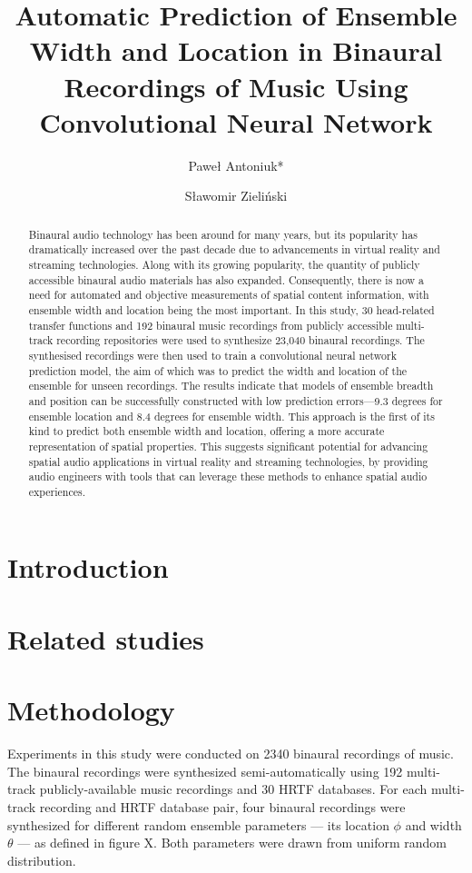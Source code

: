 \documentclass{article}
\title{Automatic Prediction of Ensemble Width and Location in Binaural Recordings of Music Using Convolutional Neural Network}
\author[1]{Paweł Antoniuk*}
\author[1]{Sławomir Zieliński}
\affil[1]{Faculty of Computer Science, Białystok University of Technology, 15-351 Białystok, Poland; pawel.antoniuk@sd.pb.edu.pl}
\affil[*]{Corresponding author: pawel.antoniuk@sd.pb.edu.pl}
\date{}
\begin{document}
\maketitle

\begin{abstract}
Binaural audio technology has been around for many years, but its popularity has dramatically increased over the past decade due to advancements in virtual reality and streaming technologies. Along with its growing popularity, the quantity of publicly accessible binaural audio materials has also expanded. Consequently, there is now a need for automated and objective measurements of spatial content information, with ensemble width and location being the most important. In this study, 30 head-related transfer functions and 192 binaural music recordings from publicly accessible multi-track recording repositories were used to synthesize 23,040 binaural recordings. The synthesised recordings were then used to train a convolutional neural network prediction model, the aim of which was to predict the width and location of the ensemble for unseen recordings. The results indicate that models of ensemble breadth and position can be successfully constructed with low prediction errors—9.3 degrees for ensemble location and 8.4 degrees for ensemble width. This approach is the first of its kind to predict both ensemble width and location, offering a more accurate representation of spatial properties. This suggests significant potential for advancing spatial audio applications in virtual reality and streaming technologies, by providing audio engineers with tools that can leverage these methods to enhance spatial audio experiences.
\end{abstract}


\section{Introduction}
\section{Related studies}
\section{Methodology}

Experiments in this study were conducted on 2340 binaural recordings of music. The binaural recordings were synthesized semi-automatically using 192 multi-track publicly-available music recordings and 30 HRTF databases. For each multi-track recording and HRTF database pair, four binaural recordings were synthesized for different random ensemble parameters --- its location $\phi$ and width $\theta$ --- as defined in figure X. Both parameters were drawn from uniform random distribution.
\end{document}
